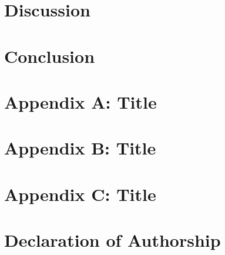 \documentclass{thesis}
\begin{document}
\chapter{Discussion}\label{ch:discussion}


\chapter{Conclusion}\label{ch:conclusion}


\printbibliography[title=References, heading=bibintoc]

\appendix

\chapter*{Appendix A: Title}\label{ch:appendix-a}


\chapter*{Appendix B: Title}\label{ch:appendix-b}


\chapter*{Appendix C: Title}\label{ch:appendix-c}


\chapter*{Declaration of Authorship}\label{ch:declaration-of-authorship}

\end{document}
